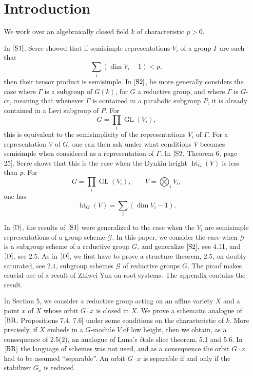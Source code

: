 \documentclass[11pt]{article}
\newcommand{\GL}{\operatorname{GL}}
\newcommand{\htG}{\operatorname{ht}_G}
\begin{document}
\section{Introduction}

We work over an algebraically closed field \(k\) of characteristic \(p>0\).

In \([{\rm S1}]\), Serre showed that if semisimple representations \(V_i\) of a group
\(\Gamma\) are such that
\[
  \sum_i(\dim V_i-1)<p,
\]
then their tensor product is semisimple. In \([{\rm S2}]\), he more generally considers the
case where \(\Gamma\) is a subgroup of \(G(k)\), for \(G\) a reductive group, and where
\(\Gamma\) is \(G\)-cr, meaning that whenever \(\Gamma\) is contained in a parabolic subgroup
\(P\), it is already contained in a Levi subgroup of \(P\). For
\[
  G=\prod_i \GL(V_i),
\]
this is equivalent to the semisimplicity of the representations \(V_i\) of \(\Gamma\).
For a representation \(V\) of \(G\), one can then ask under what conditions \(V\) becomes
semisimple when considered as a representation of \(\Gamma\). In \([{\rm S2},\)
Theorem 6, page 25], Serre shows that this is the case when the Dynkin height
\(\htG(V)\) is less than \(p\). For
\[
  G=\prod_i \GL(V_i),\qquad V=\bigotimes_i V_i,
\]
one has
\[
  \htG(V)=\sum_i(\dim V_i-1).
\]

In \([{\rm D}]\), the results of \([{\rm S1}]\) were generalized to the case when the
\(V_i\) are semisimple representations of a group scheme \(\mathcal G\). In this paper,
we consider the case when \(\mathcal G\) is a subgroup scheme of a reductive group
\(G\), and generalize \([{\rm S2}]\), see 4.11, and \([{\rm D}]\), see 2.5. As in
\([{\rm D}]\), we first have to prove a structure theorem, 2.5, on doubly saturated,
see 2.4, subgroup schemes \(\mathcal G\) of reductive groups \(G\). The proof makes
crucial use of a result of Zhiwei Yun on root systems. The appendix contains the result.

In Section 5, we consider a reductive group acting on an affine variety \(X\) and a point
\(x\) of \(X\) whose orbit \(G\cdot x\) is closed in \(X\). We prove a schematic analogue
of \([{\rm BR},\) Propositions 7.4, 7.6] under some conditions on the characteristic of
\(k\). More precisely, if \(X\) embeds in a \(G\)-module \(V\) of low height, then we obtain,
as a consequence of 2.5(2), an analogue of Luna's étale slice theorem, 5.1 and 5.6.
In \([{\rm BR}]\) the language of schemes was not used, and as a consequence the orbit
\(G\cdot x\) had to be assumed ``separable''. An orbit \(G\cdot x\) is separable if and only if
the stabilizer \(G_x\) is reduced.
\end{document}
